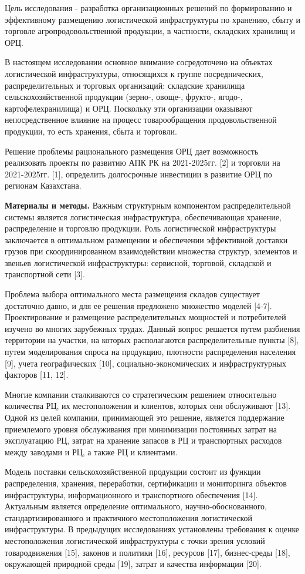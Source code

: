 \begin{multicols}{2}
Цель исследования - разработка организационных решений по
формированию и эффективному размещению логистической инфраструктуры по
хранению, сбыту и торговле агропродовольственной продукции, в частности,
складских хранилищ и ОРЦ.

В настоящем исследовании основное внимание сосредоточено на объектах
логистической инфраструктуры, относящихся к группе посреднических,
распределительных и торговых организаций: складские хранилища
сельскохозяйственной продукции (зерно-, овоще-, фрукто-, ягодо-,
картофелехранилища) и ОРЦ. Поскольку эти организации оказывают
непосредственное влияние на процесс товарообращения продовольственной
продукции, то есть хранения, сбыта и торговли.

Решение проблемы рационального размещения ОРЦ дает возможность
реализовать проекты по развитию АПК РК на 2021-2025гг. {[}2{]} и
торговли на 2021-2025гг. {[}1{]}, определить долгосрочные инвестиции в
развитие ОРЦ по регионам Казахстана.

{\bfseries Материалы и методы.} Важным структурным компонентом
распределительной системы является логистическая инфраструктура,
обеспечивающая хранение, распределение и торговлю продукции. Роль
логистической инфраструктуры заключается в оптимальном размещении и
обеспечении эффективной доставки грузов при скоординированном
взаимодействии множества структур, элементов и звеньев логистической
инфраструктуры: сервисной, торговой, складской и транспортной сети
{[}3{]}.

Проблема выбора оптимального места размещения складов существует
достаточно давно, и для ее решения предложено множество моделей
{[}4-7{]}. Проектирование и размещение распределительных мощностей и
потребителей изучено во многих зарубежных трудах. Данный вопрос решается
путем разбиения территории на участки, на которых располагаются
распределительные пункты {[}8{]}, путем моделирования спроса на
продукцию, плотности распределения населения {[}9{]}, учета
географических {[}10{]}, социально-экономических и инфраструктурных
факторов {[}11, 12{]}.

Многие компании сталкиваются со стратегическим решением относительно
количества РЦ, их местоположения и клиентов, которых они обслуживают
{[}13{]}. Одной из целей компании, принимающей это решение, является
поддержание приемлемого уровня обслуживания при минимизации постоянных
затрат на эксплуатацию РЦ, затрат на хранение запасов в РЦ и
транспортных расходов между заводами и РЦ, а также РЦ и клиентами.

Модель поставки сельскохозяйственной продукции состоит из функции
распределения, хранения, переработки, сертификации и мониторинга
объектов инфраструктуры, информационного и транспортного обеспечения
{[}14{]}. Актуальным является определение оптимального,
научно-обоснованного, стандартизированного и практичного местоположения
логистической инфраструктуры. В предыдущих исследованиях установлены
требования к оценке местоположения логистической инфраструктуры с точки
зрения условий товародвижения {[}15{]}, законов и политики {[}16{]},
ресурсов {[}17{]}, бизнес-среды {[}18{]}, окружающей природной среды
{[}19{]}, затрат и качества информации {[}20{]}.


\end{multicols}
